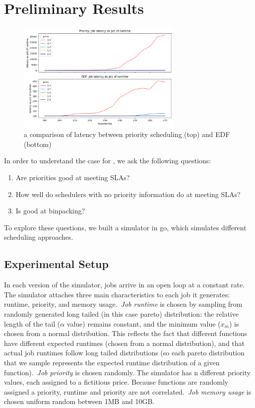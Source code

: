 \section{Preliminary Results}

\begin{figure}[t!]
    \centering
      \includegraphics[width=8cm]{img/ideal_edf_latency.png}
      \caption{ a comparison of latency between priority scheduling (top) and EDF (bottom) }
    \label{fig:edf-vs-prio}
\end{figure}



In order to understand the case for \sys{}, we ask the following questions: 
\begin{enumerate}
    \item Are priorities good at meeting SLAs?
    \item How well do schedulers with no priority information do at meeting SLAs?
    \item Is \sys{} good at binpacking?
\end{enumerate}


To explore these questions, we built a simulator in go\cite{TODO}, which
simulates different scheduling approaches.


\subsection{Experimental Setup}

In each version of the simulator, jobs arrive in an open loop at a constant
rate. The simulator attaches three main characteristics to each job it
generates: runtime, priority, and memory usage.\ \textit{Job runtime} is chosen
by sampling from randomly generated long tailed (in this case pareto)
distribution: the relative length of the tail ($\alpha$ value) remains constant,
and the minimum value ($x_m$) is chosen from a normal distribution. This
reflects the fact that different functions have different expected runtimes
(chosen from a normal distribution), and that actual job runtimes follow long
tailed distributions (so each pareto distribution that we sample represents the
expected runtime distribution of a given function).\ \textit{Job priority} is
chosen randomly. The simulator has n different priority values, each assigned to
a fictitious price. Because functions are randomly assigned a priority, runtime
and priority are not correlated.\ \textit{Job memory usage} is chosen uniform
random between 1MB and 10GB.

